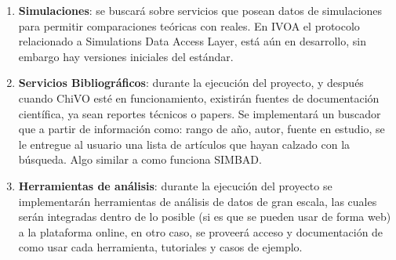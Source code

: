 \begin{enumerate}
	\item \textbf{Simulaciones}: se buscará sobre servicios que posean
datos de simulaciones para permitir comparaciones teóricas con reales. En IVOA
el protocolo relacionado a Simulations Data Access Layer, está aún en
desarrollo, sin embargo hay versiones iniciales del estándar.

	\item \textbf{Servicios Bibliográficos}: durante la ejecución del
proyecto, y después cuando ChiVO esté en funcionamiento, existirán fuentes de
documentación científica, ya sean reportes técnicos o papers. Se implementará
un buscador que a partir de información como: rango de año, autor, fuente en
estudio, se le entregue al usuario una lista de artículos que hayan calzado con
la búsqueda. Algo similar a como funciona SIMBAD.

	\item \textbf{Herramientas de análisis}: durante la ejecución del
proyecto se implementarán herramientas de análisis de datos de gran escala, las
cuales serán integradas dentro de lo posible (si es que se pueden usar de forma
web) a la plataforma online, en otro caso, se proveerá acceso y documentación
de como usar cada herramienta, tutoriales y casos de ejemplo.
\end{enumerate}
